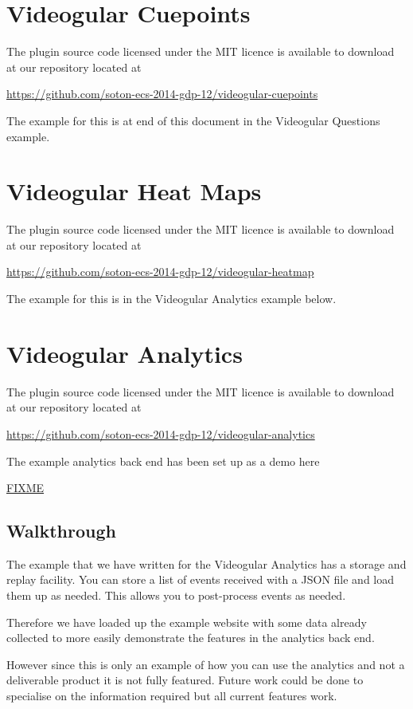 \documentclass[12pt,a4paper]{article}
\begin{document}
\section{Videogular Cuepoints}

The plugin source code licensed under the MIT licence is available to download at our repository located at 

\url{https://github.com/soton-ecs-2014-gdp-12/videogular-cuepoints}

The example for this is at end of this document in the Videogular Questions example.

\section{Videogular Heat Maps}

The plugin source code licensed under the MIT licence is available to download at our repository located at 

\url{https://github.com/soton-ecs-2014-gdp-12/videogular-heatmap}

The example for this is in the Videogular Analytics example below.

\section{Videogular Analytics}

The plugin source code licensed under the MIT licence is available to download at our repository located at 

\url{https://github.com/soton-ecs-2014-gdp-12/videogular-analytics}

The example analytics back end has been set up as a demo here

\url{FIXME}

\subsection{Walkthrough}

The example that we have written for the Videogular Analytics has a storage and replay facility. You can store a list of events received with a JSON file and load them up as needed. This allows you to post-process events as needed.

Therefore we have loaded up the example website with some data already collected to more easily demonstrate the features in the analytics back end.

However since this is only an example of how you can use the analytics and not a deliverable product it is not fully featured. Future work could be done to specialise on the information required but all current features work.
\end{document}

